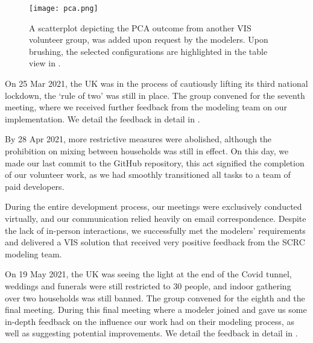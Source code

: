 \begin{figure}[tb!]
    \centering
    \texttt{[image: pca.png]}
    \caption{A scatterplot depicting the PCA outcome from another VIS volunteer group, was added upon request by the modelers. Upon brushing, the selected configurations are highlighted in the table view in .
    }
    \label{fig:pca}

\end{figure}

On 25 Mar 2021, the UK was in the process of cautiously lifting its third national lockdown, the `rule of two' was still in place.
The group convened for the seventh meeting, where we received further feedback from the modeling team on our implementation.
We detail the feedback in detail in .


By 28 Apr 2021, more restrictive measures were abolished, although the prohibition on mixing between households was still in effect.
On this day, we made our last commit to the GitHub repository, this act signified the completion of our volunteer work, as we had smoothly transitioned all tasks to a team of paid developers.

During the entire development process, our meetings were exclusively conducted virtually, and our communication relied heavily on email correspondence.
Despite the lack of in-person interactions, we successfully met the modelers' requirements and delivered a \ac{VIS} solution that received very positive feedback from the SCRC modeling team.

On 19 May 2021, the UK was seeing the light at the end of the Covid tunnel, weddings and funerals were still restricted to 30 people, and indoor gathering over two households was still banned.
The group convened for the eighth and the final meeting.
During this final meeting where a modeler joined and gave us some in-depth feedback on the influence our work had on their modeling process, as well as suggesting potential improvements.
We detail the feedback in detail in .
